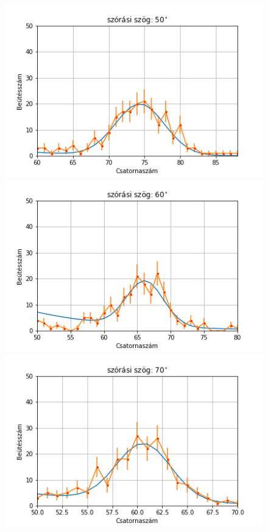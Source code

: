 \documentclass[a4paper,12pt]{article}
\begin{document}
\begin{figure}[!htb]
    \begin{minipage}{.49\textwidth}
        \centering
        \includegraphics[width=1.\linewidth]{../plots/withbackground/50_1002fit.png}
    \end{minipage}%
    \begin{minipage}{.49\textwidth}
        \centering
        \includegraphics[width=1.\linewidth]{../plots/withbackground/60_962fit.png}
    \end{minipage}
    \begin{minipage}{.49\textwidth}
        \centering
        \includegraphics[width=1.\linewidth]{../plots/withbackground/70_1166fit.png}

\end{minipage}
\end{figure}
\end{document}
